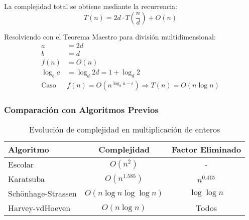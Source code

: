 \documentclass{article}
\begin{document}
La complejidad total se obtiene mediante la recurrencia:
\begin{equation}
    T(n) = 2d \cdot T\left(\frac{n}{d}\right) + O(n)
\end{equation}

Resolviendo con el Teorema Maestro para división multidimensional:
\begin{align*}
    a &= 2d \\
    b &= d \\
    f(n) &= O(n) \\
    \log_b a &= \log_d 2d = 1 + \log_d 2 \\
    \text{Caso } &f(n) = O(n^{\log_b a - \epsilon}) \Rightarrow T(n) = O(n \log n)
\end{align*}

\subsubsection{Comparación con Algoritmos Previos}
\begin{table}[h]
\centering
\begin{tabular}{l|c|c}
Algoritmo & Complejidad & Factor Eliminado \\
\hline
Escolar & \( O(n^2) \) & - \\
Karatsuba & \( O(n^{1.585}) \) & \( n^{0.415} \) \\
Schönhage-Strassen & \( O(n \log n \log \log n) \) & \( \log \log n \) \\
Harvey-vdHoeven & \( O(n \log n) \) & Todos \\
\end{tabular}
\caption{Evolución de complejidad en multiplicación de enteros}
\end{table}
\end{document}
